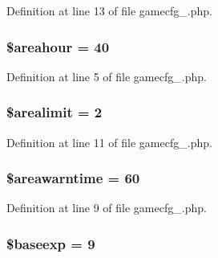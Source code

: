 Definition at line 13 of file gamecfg\+\_.\+php.

\hypertarget{gamecfg__1_8php_a1828d2cbb2cd747c5cd48602b4ca09cb}{
\subsubsection[{\$areahour}]{\setlength{\rightskip}{0pt plus 5cm}\$areahour = 40}}\label{gamecfg__1_8php_a1828d2cbb2cd747c5cd48602b4ca09cb}


Definition at line 5 of file gamecfg\+\_.\+php.

\hypertarget{gamecfg__1_8php_ae95b2cf977f6bac24ace0c8e92cde4b3}{
\subsubsection[{\$arealimit}]{\setlength{\rightskip}{0pt plus 5cm}\$arealimit = 2}}\label{gamecfg__1_8php_ae95b2cf977f6bac24ace0c8e92cde4b3}


Definition at line 11 of file gamecfg\+\_.\+php.

\hypertarget{gamecfg__1_8php_a045c9f101f315674842ecec326fd0c03}{
\subsubsection[{\$areawarntime}]{\setlength{\rightskip}{0pt plus 5cm}\$areawarntime = 60}}\label{gamecfg__1_8php_a045c9f101f315674842ecec326fd0c03}


Definition at line 9 of file gamecfg\+\_.\+php.

\hypertarget{gamecfg__1_8php_ae186f0eaca174601c88af42fb1accfb6}{
\subsubsection[{\$baseexp}]{\setlength{\rightskip}{0pt plus 5cm}\$baseexp = 9}}\label{gamecfg__1_8php_ae186f0eaca174601c88af42fb1accfb6}


